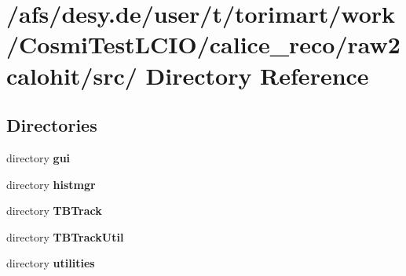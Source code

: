 \section{/afs/desy.de/user/t/torimart/work/CosmiTestLCIO/calice\_\-reco/raw2calohit/src/ Directory Reference}
\label{dir_4ccc65e3147d3d4ef3c56822860bbd3e}
\subsection*{Directories}
\begin{DoxyCompactItemize}
\item 
directory {\bf gui}
\item 
directory {\bf histmgr}
\item 
directory {\bf TBTrack}
\item 
directory {\bf TBTrackUtil}
\item 
directory {\bf utilities}
\end{DoxyCompactItemize}
